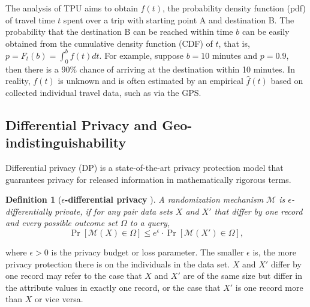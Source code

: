 \documentclass[10pt,journal,compsoc]{IEEEtran}
\newtheorem{defn}{Definition}
\newcommand{\M}{\mathcal{M}}
\begin{document}
The analysis of TPU aims to obtain $f(t)$, the probability density function (pdf) of travel time $t$ spent over a trip with starting point A and destination B.  The probability that the destination B can be reached within time $b$ can be easily obtained from the cumulative density function (CDF) of $t$, that is, $p\!=\!F_t(b)\!=\!\int_{0}^{b}f(t)dt$. For example, suppose $b\!=\!10$ minutes and $p\!=\!0.9$, then there is a 90$\%$ chance of arriving at the destination within 10 minutes. In reality, $f(t)$ is unknown and is often estimated by an empirical $\hat{f}(t)$ based on collected individual travel data, such as via the GPS. 


\vspace{-6pt}\subsection{Differential Privacy and Geo-indistinguishability}\vspace{-3pt}
Differential privacy (DP) is a state-of-the-art privacy protection model that guarantees privacy for released information in mathematically rigorous terms. 
\begin{defn}[\textbf{$\epsilon$-differential privacy} \cite{dwork2006calibrating}]\label{def:DP}
A randomization mechanism $\M$ is $\epsilon$-differentially private, if for any pair data sets $X$ and $X'$ that differ by one record and every possible outcome set $\Omega$ to a query,
\begin{equation}
\Pr[\M(X)\in\Omega]\le{e^{\epsilon}}\cdot{\Pr[\M(X')\in{\Omega}]},
\end{equation}
\end{defn}\vspace{-6pt}
where  $\epsilon>0$ is the privacy budget or loss parameter. The smaller $\epsilon$ is, the more privacy protection there is on the individuals in the data set. $X$ and $X'$ differ by one record may refer to the case that $X$ and $X'$ are of the same size but differ in the attribute values in exactly one record, or the case that $X'$ is one record more than $X$ or vice versa. 
\end{document}
